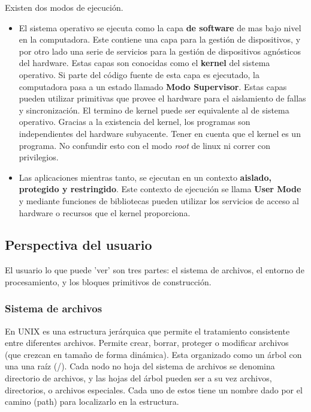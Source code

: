 \documentclass[titlepage,a4paper]{article}
\begin{document}
Existen dos modos de ejecución.
\begin{itemize}
    \item El sistema operativo se ejecuta como la capa \textbf{de software} de mas bajo nivel en la computadora. Este contiene una capa para la gestión de dispositivos, y por otro lado una serie de servicios para la gestión de dispositivos agnósticos del hardware. Estas capas son conocidas como el \textbf{kernel} del sistema operativo. Si parte del código fuente de esta capa es ejecutado, la computadora pasa a un estado llamado \textbf{Modo Supervisor}. Estas capas pueden utilizar primitivas que provee el hardware para el aislamiento de fallas y sincronización. El termino de kernel puede ser equivalente al de sistema operativo. Gracias a la existencia del kernel, los programas son independientes del hardware subyacente. Tener en cuenta que el kernel es un programa. No confundir esto con el modo \textit{root} de linux ni correr con privilegios.
    
    \item Las aplicaciones mientras tanto, se ejecutan en un contexto \textbf{aislado, protegido y restringido}. Este contexto de ejecución se llama \textbf{User Mode} y mediante funciones de bibliotecas pueden utilizar los servicios de acceso al hardware o recursos que el kernel proporciona.

\end{itemize}

\subsection*{Perspectiva del usuario}

El usuario lo que puede 'ver' son tres partes: el sistema de archivos, el entorno de procesamiento, y los bloques primitivos de construcción.

\subsubsection*{Sistema de archivos}

En UNIX es una estructura jerárquica que permite el tratamiento consistente entre diferentes archivos. Permite crear, borrar, proteger o modificar archivos (que crezcan en tamaño de forma dinámica).
Esta organizado como un árbol con una una raíz (/). Cada nodo no hoja del sistema de archivos se denomina directorio de archivos, y las hojas del árbol pueden ser a su vez archivos, directorios, o archivos especiales. Cada uno de estos tiene un nombre dado por el camino (path) para localizarlo en la estructura.
\end{document}
